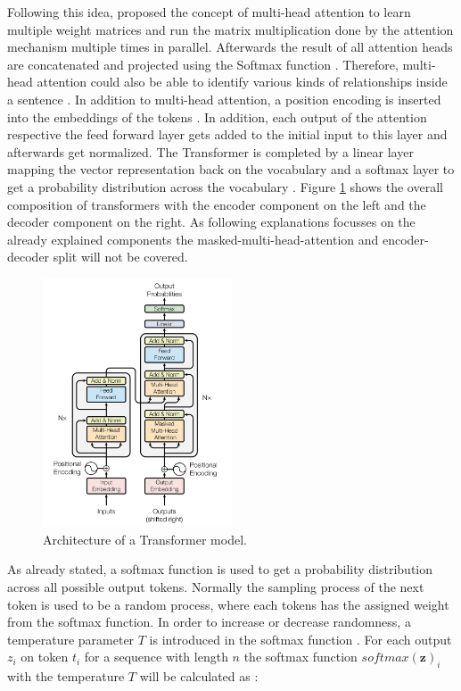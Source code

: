 \documentclass[a4paper,oneside,bibliography=totoc]{scrbook}
\begin{document}
Following this idea, \citet{Vaswani2023} proposed the concept of multi-head attention to learn multiple weight matrices and run the matrix multiplication done by the attention mechanism multiple times in parallel. Afterwards the result of all attention heads are concatenated and projected using the Softmax function \cite{Vaswani2023}. Therefore, multi-head attention could also be able to identify various kinds of relationships inside a sentence \cite{Sanderson2024}. In addition to multi-head attention, a position encoding is inserted into the embeddings of the tokens \cite{Vaswani2023}. In addition, each output of the attention respective the feed forward layer gets added to the initial input to this layer and afterwards get normalized. The Transformer is completed by a linear layer mapping the vector representation back on the vocabulary and a softmax layer to get a probability distribution across the vocabulary \cite{Vaswani2023}. Figure \ref{fig:transformer} shows the overall composition of transformers with the encoder component on the left and the decoder component on the right. As following explanations focusses on the already explained components the masked-multi-head-attention and encoder-decoder split will not be covered.

\begin{figure}[h]
  \centering
  \includegraphics[width=0.5\textwidth]{figures/Transformer.png}
  \caption{Architecture of a Transformer model. \cite{Vaswani2023}}
  \label{fig:transformer}
\end{figure}

As already stated, a softmax function is used to get a probability distribution across all possible output tokens. Normally the sampling process of the next token is used to be a random process, where each tokens has the assigned weight from the softmax function. In order to increase or decrease randomness, a temperature parameter $T$ is introduced in the softmax function \cite{Peeperkorn2024}. For each output $z_i$ on token $t_i$ for a sequence with length $n$ the softmax function $softmax(\mathbf{z})_i$ with the temperature $T$ will be calculated as \cite{Peeperkorn2024}:
\end{document}
